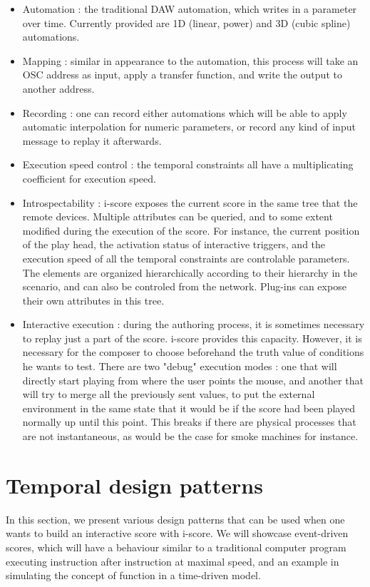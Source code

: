 \documentclass{article}
\begin{document}
\begin{itemize}
\item Automation : the traditional DAW automation, which writes in a parameter over time. Currently provided are 1D (linear, power) and 3D (cubic spline) automations.
\item Mapping : similar in appearance to the automation, this process will take an OSC address as input, apply a transfer function, and write the output to another address.
\item Recording : one can record either automations which will be able to apply automatic interpolation for numeric parameters, or record any kind of input message to replay it afterwards.
\item Execution speed control : the temporal constraints all have a multiplicating coefficient for execution speed.
\item Introspectability : i-score exposes the current score in the same tree that the remote devices. 
Multiple attributes can be queried, and to some extent modified during the execution of the score. 
For instance, the current position of the play head, the activation status of interactive triggers, and the execution speed of all the temporal constraints are controlable parameters.
The elements are organized hierarchically according to their hierarchy in the scenario, and can also be controled from the network.
Plug-ins can expose their own attributes in this tree.
\item Interactive execution : during the authoring process, it is sometimes necessary to replay just a part of the score.
i-score provides this capacity. 
However, it is necessary for the composer to choose beforehand the truth value of conditions he wants to test.
There are two "debug" execution modes : one that will directly start playing from where the user points the mouse, and another that will try to merge all the previously sent values, to put the external environment in the same state that it would be if the score had been played normally up until this point. 
This breaks if there are physical processes that are not instantaneous, as would be the case for smoke machines for instance.
\end{itemize}
\section{Temporal design patterns}
In this section, we present various design patterns that can be used 
when one wants to build an interactive score with i-score.
We will showcase event-driven scores, which will have a behaviour 
similar to a traditional computer program executing instruction after 
instruction at maximal speed, and an example in simulating the 
concept of function in a time-driven model.
\end{document}

